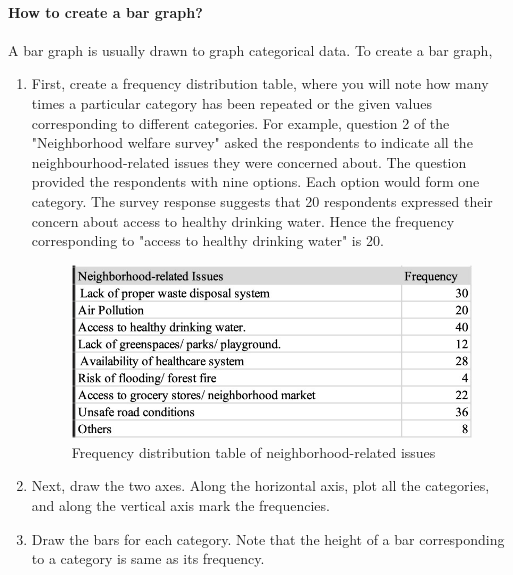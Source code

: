 \documentclass[a4paper, 11pt]{article}
\begin{document}
	\paragraph{How to create a bar graph?}
   A bar graph is usually drawn to graph categorical data. To create a bar graph,
    \begin{enumerate}[label=(\alph*), noitemsep]
			\item
	First, create a frequency distribution table, where you will note how many times a particular category has been repeated or the given values corresponding to different categories. For example, question 2 of the "Neighborhood welfare survey" asked the respondents to indicate all the neighbourhood-related issues they were concerned about. The question provided the respondents with nine options. Each option would form one category. The survey response suggests that 20 respondents expressed their concern about access to healthy drinking water. Hence the frequency corresponding to "access to healthy drinking water" is 20. 
	\begin{figure}[h!]
		\includegraphics[width=\linewidth]{Freq_dist.jpg}
		\caption{Frequency distribution table of neighborhood-related issues} 
	\end{figure}
	\item
	Next, draw the two axes. Along the horizontal axis, plot all the categories, and along the vertical axis mark the frequencies. 
	\item
	Draw the bars for each category. Note that the height of a bar corresponding to a category is same as its frequency.
			\end{enumerate}
%
\end{document}
